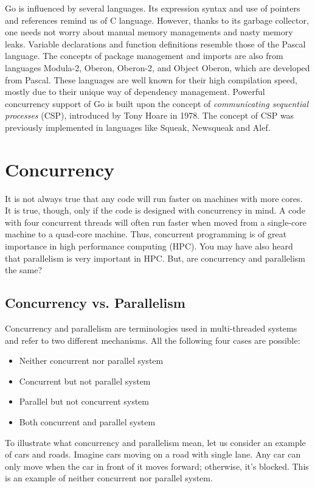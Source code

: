 \documentclass[11pt]{article}
\begin{document}
Go is influenced by several languages. Its expression syntax and use of pointers and references remind us of C language. However, thanks to its garbage collector, one needs not worry about manual memory managements and nasty memory leaks. Variable declarations and function definitions resemble those of the Pascal language. The concepts of package management and imports are also from languages Modula-2, Oberon, Oberon-2, and Object Oberon, which are developed from Pascal. These languages are well known for their high compilation speed, mostly due to their unique way of dependency management. Powerful concurrency support of Go is built upon the concept of \emph{communicating sequential processes} (CSP), introduced by Tony Hoare in 1978. The concept of CSP was previously implemented in languages like Squeak, Newsqueak and Alef.

\section{Concurrency}
\label{sec:orgheadline6}
It is not always true that any code will run faster on machines with more cores. It is true, though, only if the code is designed with concurrency in mind. A code with four concurrent threads will often run faster when moved from a single-core machine to a quad-core machine. Thus, concurrent programming is of great importance in high performance computing (HPC). You may have also heard that parallelism is very important in HPC. But, are concurrency and parallelism the same?

\subsection{Concurrency vs. Parallelism}
\label{sec:orgheadline2}
Concurrency and parallelism are terminologies used in multi-threaded systems and refer to two different mechanisms. All the following four cases are possible:
\begin{itemize}
\item Neither concurrent nor parallel system
\item Concurrent but not parallel system
\item Parallel but not concurrent system
\item Both concurrent and parallel system
\end{itemize}
To illustrate what concurrency and parallelism mean, let us consider an example of cars and roads. Imagine cars moving on a road with single lane. Any car can only move when the car in front of it moves forward; otherwise, it's blocked. This is an example of neither concurrent nor parallel system.
\end{document}
